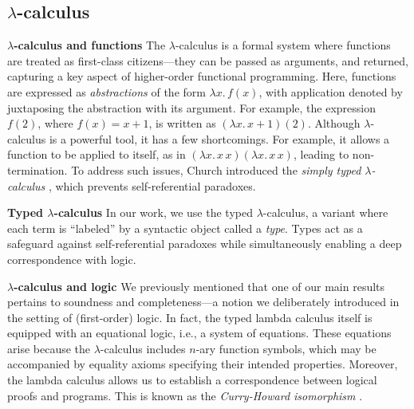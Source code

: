 


\subsection*{ $\lambda$-calculus}
\noindent \textbf{$\lambda$-calculus and functions}
The $\lambda$-calculus is a formal system where functions are treated as first-class citizens---they can be passed as arguments, and returned, capturing a key aspect of higher-order functional programming.
 Here, functions are expressed as \emph{abstractions} of the form $\lambda x.\,f(x)$, with application denoted by juxtaposing the abstraction with its argument. For example, the expression $f(2)$, where $f(x) = x + 1$, is written as $(\lambda x.\,x + 1)(2)$. 
Although $\lambda$-calculus is a powerful tool, it has a few shortcomings. For example, it allows a function to be applied to itself, as in $(\lambda x.\,x\,x)(\lambda x.\,x\,x)$, leading to non-termination. To address such issues, Church introduced the \emph{simply typed $\lambda$-calculus} \cite{churchFormulationSimpleTheory1940}, which prevents self-referential paradoxes.


\noindent \textbf{Typed $\lambda$-calculus}
In our work, we use the typed $\lambda$-calculus, a variant where each term is ``labeled'' by a syntactic object called a \emph{type}. Types act as a safeguard against self-referential paradoxes while simultaneously enabling a deep correspondence with logic.


\noindent \textbf{$\lambda$-calculus and logic} 
We previously mentioned that one of our main results pertains to soundness and completeness---a notion we deliberately introduced in the setting of (first-order) logic. In fact, the typed lambda calculus itself is equipped with an equational logic, i.e., a system of equations. These equations arise because the $\lambda$-calculus includes $n$-ary function symbols, which may be accompanied by equality axioms specifying their intended properties. Moreover, the lambda calculus allows us to establish a correspondence between logical proofs and programs. This is known as the \emph{Curry-Howard isomorphism} \cite{girardProofsTypes1989}.

